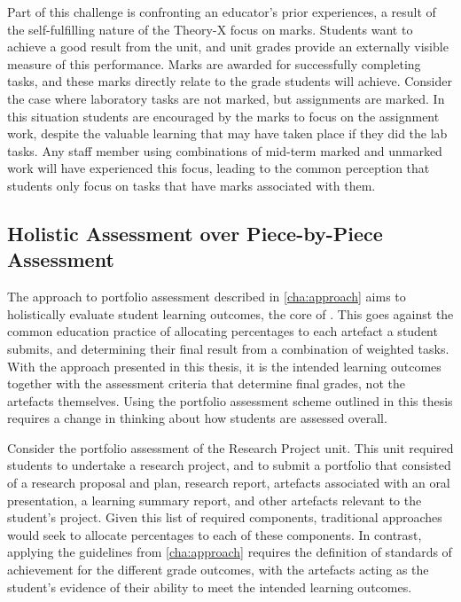 Part of this challenge is confronting an educator's prior experiences, a result of the self-fulfilling nature of the Theory-X focus on marks. Students want to achieve a good result from the unit, and unit grades provide an externally visible measure of this performance. Marks are awarded for successfully completing tasks, and these marks directly relate to the grade students will achieve. Consider the case where laboratory tasks are not marked, but assignments are marked. In this situation students are encouraged by the marks to focus on the assignment work, despite the valuable learning that may have taken place if they did the lab tasks. Any staff member using combinations of mid-term marked and unmarked work will have experienced this focus, leading to the common perception that students only focus on tasks that have marks associated with them.


\subsection{Holistic Assessment over Piece-by-Piece Assessment} %
\label{sub:holistic_assessment_over_piece_by_piece_assessment}

The approach to portfolio assessment described in \cref{cha:approach} aims to holistically evaluate student learning outcomes, the core of . This goes against the common education practice of allocating percentages to each artefact a student submits, and determining their final result from a combination of weighted tasks. With the approach presented in this thesis, it is the intended learning outcomes together with the assessment criteria that determine final grades, not the artefacts themselves. Using the portfolio assessment scheme outlined in this thesis requires a change in thinking about how students are assessed overall.

Consider the portfolio assessment of the Research Project unit. This unit required students to undertake a research project, and to submit a portfolio that consisted of a research proposal and plan, research report, artefacts associated with an oral presentation, a learning summary report, and other artefacts relevant to the student's project. Given this list of required components, traditional approaches would seek to allocate percentages to each of these components. In contrast, applying the guidelines from \cref{cha:approach} requires the definition of standards of achievement for the different grade outcomes, with the artefacts acting as the student's evidence of their ability to meet the intended learning outcomes.

